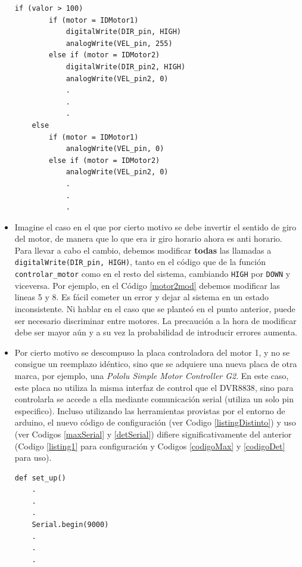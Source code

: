 \begin{itemize}
\begin{lstlisting}[caption=Modificación de la función controlar\_motor para cambiar comportamiento al utilizar el motor 2.,label={motor2mod}]
	if (valor > 100)
		if (motor = IDMotor1)
    		digitalWrite(DIR_pin, HIGH)
	    	analogWrite(VEL_pin, 255)
		else if (motor = IDMotor2)
	    	digitalWrite(DIR_pin2, HIGH)
	    	analogWrite(VEL_pin2, 0)
	    	.
	    	.
	    	.
	else
		if (motor = IDMotor1)
	    	analogWrite(VEL_pin, 0)
		else if (motor = IDMotor2)
	    	analogWrite(VEL_pin2, 0)
	    	.
	    	.
	    	.

\end{lstlisting}
	\item Imagine el caso en el que por cierto motivo se debe invertir el sentido de giro del motor, de manera que lo que era ir giro horario ahora es anti horario. Para llevar a cabo el cambio, debemos modificar \textbf{todas} las llamadas a \verb|digitalWrite(DIR_pin, HIGH)|, tanto en el código que de la función \verb|controlar_motor| como en el resto del sistema, cambiando \verb|HIGH| por \verb|DOWN| y viceversa. Por ejemplo, en el Código \ref{motor2mod} debemos modificar las lineas 5 y 8. Es fácil cometer un error y dejar al sistema en un estado inconsistente. Ni hablar en el caso que se planteó en el punto anterior, puede ser necesario discriminar entre motores. La precaución a la hora de modificar debe ser mayor aún y a su vez la probabilidad de introducir errores aumenta.
   
    \item Por cierto motivo se descompuso la placa controladora del motor 1, y no se consigue un reemplazo idéntico, sino que se adquiere una nueva placa de otra marca, por ejemplo, una \textit{Pololu Simple Motor Controller G2}. En este caso, este placa no utiliza la misma interfaz de control que el \gls{DVR8838}, sino para controlarla se accede a ella mediante comunicación serial (utiliza un solo pin especifico). Incluso utilizando las herramientas provistas por el entorno de \gls{arduino}, el nuevo código de configuración (ver Codigo \ref{listingDistinto}) y uso (ver Codigos \ref{maxSerial} y \ref{detSerial}) difiere significativamente del anterior (Codigo \ref{listing1} para configuración y Codigos \ref{codigoMax} y \ref{codigoDet} para uso).
\begin{lstlisting}[caption=Configuración de la placa de control del motor DC utiliza comunicación serie., label={listingDistinto}]
def set_up() 
    .
    .
    .
    Serial.begin(9000)
    .
    .
    .


\end{lstlisting}
\end{itemize}
